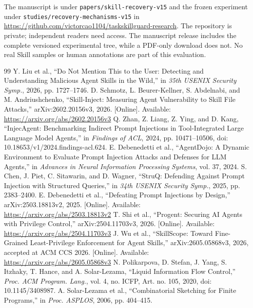 \documentclass[conference]{IEEEtran}
\begin{document}
The manuscript is under \nolinkurl{papers/skill-recovery-v15} and the frozen experiment under \nolinkurl{studies/recovery-mechanisms-v15} in \url{https://github.com/victorcao1104/taskskillguard-research}. The repository is private; independent readers need access. The manuscript release includes the complete versioned experimental tree, while a PDF-only download does not. No real Skill samples or human annotations are part of this evaluation.

\clearpage
{}
\begin{thebibliography}{99}
 Y. Liu et al., ``Do Not Mention This to the User: Detecting and Understanding Malicious Agent Skills in the Wild,'' in \emph{35th USENIX Security Symp.}, 2026, pp. 1727--1746.
 D. Schmotz, L. Beurer-Kellner, S. Abdelnabi, and M. Andriushchenko, ``Skill-Inject: Measuring Agent Vulnerability to Skill File Attacks,'' arXiv:2602.20156v3, 2026. [Online]. Available: \url{https://arxiv.org/abs/2602.20156v3}
 Q. Zhan, Z. Liang, Z. Ying, and D. Kang, ``InjecAgent: Benchmarking Indirect Prompt Injections in Tool-Integrated Large Language Model Agents,'' in \emph{Findings of ACL}, 2024, pp. 10471--10506, doi: 10.18653/v1/2024.findings-acl.624.
 E. Debenedetti et al., ``AgentDojo: A Dynamic Environment to Evaluate Prompt Injection Attacks and Defenses for LLM Agents,'' in \emph{Advances in Neural Information Processing Systems}, vol. 37, 2024.
 S. Chen, J. Piet, C. Sitawarin, and D. Wagner, ``StruQ: Defending Against Prompt Injection with Structured Queries,'' in \emph{34th USENIX Security Symp.}, 2025, pp. 2383--2400.
 E. Debenedetti et al., ``Defeating Prompt Injections by Design,'' arXiv:2503.18813v2, 2025. [Online]. Available: \url{https://arxiv.org/abs/2503.18813v2}
 T. Shi et al., ``Progent: Securing AI Agents with Privilege Control,'' arXiv:2504.11703v3, 2026. [Online]. Available: \url{https://arxiv.org/abs/2504.11703v3}
 J. Wu et al., ``SkillScope: Toward Fine-Grained Least-Privilege Enforcement for Agent Skills,'' arXiv:2605.05868v3, 2026, accepted at ACM CCS 2026. [Online]. Available: \url{https://arxiv.org/abs/2605.05868v3}
 N. Polikarpova, D. Stefan, J. Yang, S. Itzhaky, T. Hance, and A. Solar-Lezama, ``Liquid Information Flow Control,'' \emph{Proc. ACM Program. Lang.}, vol. 4, no. ICFP, Art. no. 105, 2020, doi: 10.1145/3408987.
 A. Solar-Lezama et al., ``Combinatorial Sketching for Finite Programs,'' in \emph{Proc. ASPLOS}, 2006, pp. 404--415.

\end{thebibliography}
\end{document}
